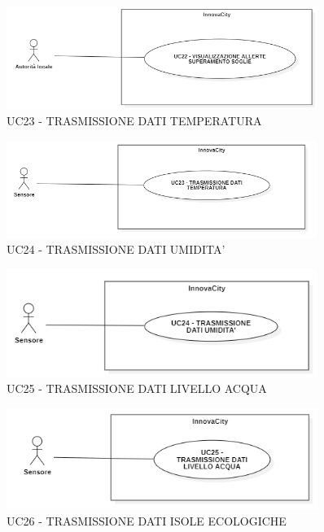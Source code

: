 \begin{figure}[H]
    \centering
    \includegraphics[width=0.9\textwidth]{../Images/uc22.PNG}
    \caption{UC23 - TRASMISSIONE DATI TEMPERATURA}
\end{figure}

\begin{figure}[H]
    \centering
    \includegraphics[width=0.9\textwidth]{../Images/uc23.PNG}
    \caption{UC24 - TRASMISSIONE DATI UMIDITA'}
\end{figure}

\begin{figure}[H]
    \centering
    \includegraphics[width=0.9\textwidth]{../Images/uc24.PNG}
    \caption{UC25 - TRASMISSIONE DATI LIVELLO ACQUA}
\end{figure}

\begin{figure}[H]
    \centering
    \includegraphics[width=0.9\textwidth]{../Images/uc25.PNG}
    \caption{UC26 - TRASMISSIONE DATI ISOLE ECOLOGICHE}
\end{figure}
